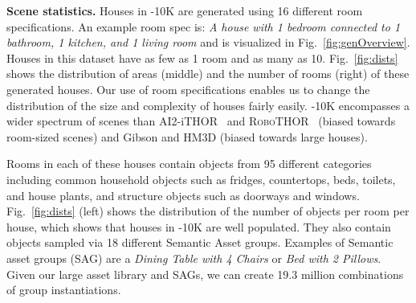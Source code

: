 \noindent \textbf{Scene statistics.} Houses in \env-10K are generated using 16 different room specifications. An example room spec is: \emph{A house with 1 bedroom connected to 1 bathroom, 1 kitchen, and 1 living room} and is visualized in Fig.~\ref{fig:genOverview}. Houses in this dataset have as few as 1 room and as many as 10. 
Fig.~\ref{fig:dists} shows the distribution of areas (middle) and the number of rooms (right) of these generated houses. Our use of room specifications enables us to change the distribution of the size and complexity of houses fairly easily. \env-10K encompasses a wider spectrum of scenes than AI2-iTHOR~\cite{kolve2017ai2} and \textsc{RoboTHOR}~\cite{Deitke2020RoboTHORAO} (biased towards room-sized scenes) and Gibson \cite{xia2018gibson} and HM3D \cite{Ramakrishnan2021HabitatMatterport3D} (biased towards large houses).

Rooms in each of these houses contain objects from 95 different categories including common household objects such as fridges, countertops, beds, toilets, and house plants, and structure objects such as doorways and windows. Fig.~\ref{fig:dists} (left) shows the distribution of the number of objects per room per house, which shows that houses in \env-10K are well populated. They also contain objects sampled via 18 different Semantic Asset groups. Examples of Semantic asset groups (SAG) are a \emph{Dining Table with 4 Chairs} or \emph{Bed with 2 Pillows}. Given our large asset library and SAGs, we can create 19.3 million combinations of group instantiations. 




